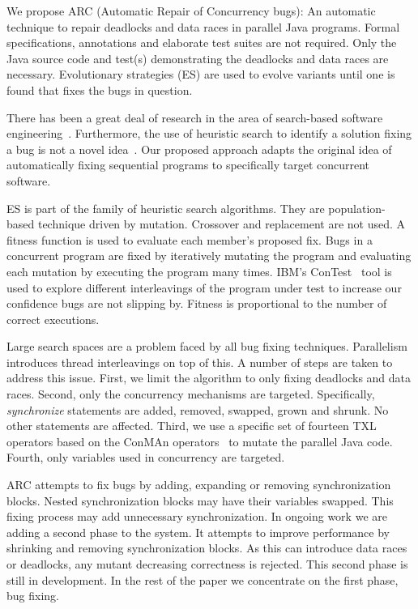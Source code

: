 \documentclass{llncs}
\begin{document}
We propose ARC (Automatic Repair of Concurrency bugs): An automatic technique
to repair deadlocks and data races in parallel Java programs. Formal
specifications, annotations and elaborate test suites are not required. Only
the Java source code and test(s) demonstrating the deadlocks and data races are
necessary. Evolutionary strategies (ES) are used to evolve variants until one
is found that fixes the bugs in question.

There has been a great deal of research in the area of search-based software
engineering~\cite{Har+10}. Furthermore, the use of heuristic search to identify
a solution fixing a bug is not a novel idea~\cite{FNWG09, AY08, Arc08, WT10,
WNLF09, WFGN10}. Our proposed approach adapts the original idea of
automatically fixing sequential programs to specifically target concurrent
software.

ES is part of the family of heuristic search algorithms. They are population-
based technique driven by mutation. Crossover and replacement are not used.
A fitness function is used to evaluate each member's proposed fix. Bugs in a
concurrent program are fixed by iteratively mutating the program and evaluating
each mutation by executing the program many times. IBM's ConTest~\cite{EFN+02}
tool is used to explore different interleavings of the program under test to
increase our confidence bugs are not slipping by. Fitness is proportional to the
number of correct executions.

Large search spaces are a problem faced by all bug fixing techniques.
Parallelism introduces thread interleavings on top of this. A number of steps
are taken to address this issue. First, we limit the algorithm to only fixing
deadlocks and data races. Second, only the concurrency mechanisms are targeted.
Specifically, \textit{synchronize} statements are added, removed, swapped,
grown and shrunk. No other statements are affected. Third, we use a specific
set of fourteen TXL~\cite{CHP91} operators based on the ConMAn
operators~\cite{BCD06} to mutate the parallel Java code.  Fourth, only variables
used in concurrency are targeted.

ARC attempts to fix bugs by adding, expanding or removing synchronization 
blocks.  Nested synchronization blocks may have their variables swapped.
This fixing process may add unnecessary
synchronization. In ongoing work we are adding a second phase to the system.  It
attempts to improve performance by shrinking and removing synchronization
blocks. As this can introduce data races or deadlocks, any mutant decreasing
correctness is rejected. This second phase is still in development.  In the rest of
the paper we concentrate on the first phase, bug fixing.
\end{document}
